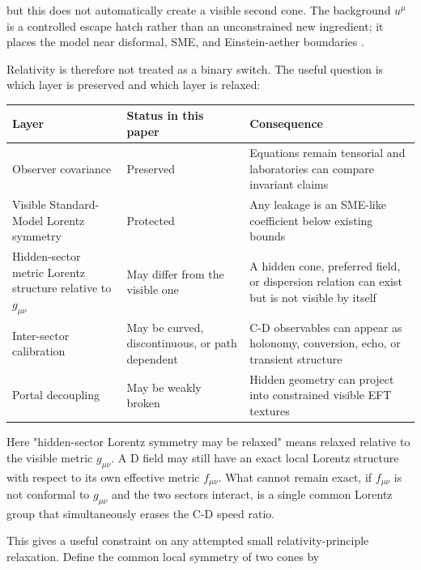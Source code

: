 \documentclass[11pt]{article}
\begin{document}
but this does not automatically create a visible second cone. The background \(u^\mu\) is a controlled escape hatch rather than an unconstrained new ingredient; it places the model near disformal, SME, and Einstein-aether boundaries \citep{Bekenstein1993DisformalGeometry,Jacobson2008EinsteinAetherStatus}.


Relativity is therefore not treated as a binary switch. The useful question is which layer is preserved and which layer is relaxed:


\begin{center}
\small
\begin{tabularx}{\textwidth}{@{}>{\raggedright\arraybackslash}p{} >{\raggedright\arraybackslash}p{} >{\raggedright\arraybackslash}p{}@{}}
\toprule
Layer & Status in this paper & Consequence \\
\midrule
Observer covariance & Preserved & Equations remain tensorial and laboratories can compare invariant claims \\
Visible Standard-Model Lorentz symmetry & Protected & Any leakage is an SME-like coefficient below existing bounds \\
Hidden-sector metric Lorentz structure relative to \(g_{\mu\nu}\) & May differ from the visible one & A hidden cone, preferred field, or dispersion relation can exist but is not visible by itself \\
Inter-sector calibration & May be curved, discontinuous, or path dependent & C-D observables can appear as holonomy, conversion, echo, or transient structure \\
Portal decoupling & May be weakly broken & Hidden geometry can project into constrained visible EFT textures \\
\bottomrule
\end{tabularx}
\end{center}


Here "hidden-sector Lorentz symmetry may be relaxed" means relaxed relative to the visible metric \(g_{\mu\nu}\). A D field may still have an exact local Lorentz structure with respect to its own effective metric \(f_{\mu\nu}\). What cannot remain exact, if \(f_{\mu\nu}\) is not conformal to \(g_{\mu\nu}\) and the two sectors interact, is a single common Lorentz group that simultaneously erases the C-D speed ratio.


This gives a useful constraint on any attempted small relativity-principle relaxation. Define the common local symmetry of two cones by
\end{document}
